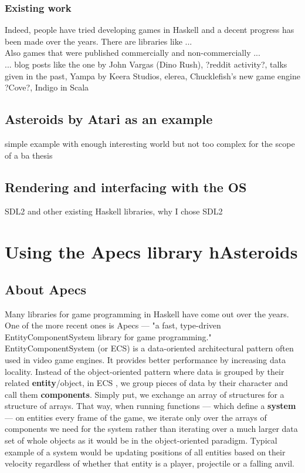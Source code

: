 \documentclass[
  digital, %
  color,   %
  table,   %
  oneside, %
  lof,     %
  lot,     %
]{fithesis3}
\begin{document}
\subsection{Existing work}
Indeed, people have tried developing games in Haskell and a decent
progress has been made over the years. There are libraries like ...\\
Also games that were published commercially and non-commercially ...\\
... blog posts like the one by John Vargas (Dino Rush), ?reddit activity?,
talks given in the past, Yampa by Keera Studios, elerea,
Chucklefish's new game engine ?Cove?, Indigo in Scala

\section{Asteroids by Atari as an example}
simple example with enough interesting world
but not too complex for the scope of a ba thesis

\section{Rendering and interfacing with the OS}
SDL2 and other existing Haskell libraries, why I chose SDL2


\chapter{Using the Apecs library \textemdash{} hAsteroids}

\section{About Apecs}
Many libraries for game programming in Haskell have come out over the years.
One of the more recent ones is Apecs — "a fast, type-driven
Entity\textendash{}Component\textendash{}System library for game programming."\cite{apecsrepo}
Entity\textendash{}Component\textendash{}System (or ECS) is a data-oriented architectural pattern often
used in video game engines. It provides better performance
by increasing data locality. Instead of the object-oriented pattern
where data is grouped by their related \textbf{entity}/object, in ECS
, we group pieces of data by their character and call them \textbf{components}.
Simply put, we exchange an array of structures for a structure of arrays.
That way, when running functions — which define a \textbf{system} — on entities
every frame of the game, we iterate only over the arrays of components
we need for the system rather than iterating over a much
larger data set of whole objects as it would be in the object-oriented paradigm.
Typical example of a system would be updating positions of all entities
based on their velocity regardless of whether that entity is a player,
projectile or a falling anvil.
\end{document}
